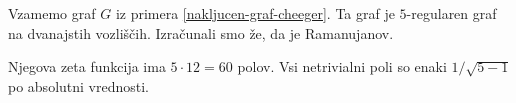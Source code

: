 \begin{primer}
    Vzamemo graf \(G\) iz primera \ref{nakljucen-graf-cheeger}. Ta graf je \(5\)-regularen graf na dvanajstih vozliščih. Izračunali smo že, da je Ramanujanov.

    Njegova zeta funkcija ima \(5\cdot 12 = 60\) polov. Vsi netrivialni poli so enaki \(1/\sqrt{5-1}\) po absolutni vrednosti.

    \begin{figure}[H]
        \centering
{}
\end{figure}
\end{primer}
